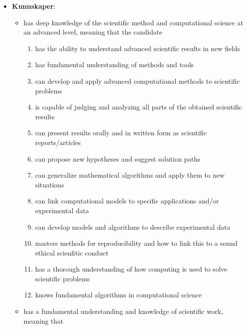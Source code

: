 \documentclass{article}
\begin{document}
\begin{itemize}
\item \textbf{Kunnskaper}: 
\begin{itemize}

 \item has deep knowledge of the scientific method and computational science at an advanced level, meaning that the candidate
\begin{enumerate}

 \item has the ability to understand advanced scientific results in new fields

 \item has fundamental understanding of methods and tools

 \item can develop and apply advanced computational methods to scientific problems

 \item is capable of judging and analyzing all parts of the obtained scientific results

 \item can present results orally and in written form as scientific reports/articles

 \item can propose new hypotheses and suggest solution paths

 \item can generalize mathematical algorithms and apply them to new situations

 \item can link computational models to specific applications and/or experimental data

 \item can develop models and algorithms to describe experimental data

\item masters methods for reproducibility and how to link this to a sound ethical scienfitic conduct

\item has a thorough understanding of how computing is used to  solve  scientific problems
\item knows fundamental algorithms in computational science

\end{enumerate}

\noindent
 \item has a fundamental understanding and knowledge of scientific work, meaning that
\begin{enumerate}


\end{enumerate}
\end{itemize}
\end{itemize}
\end{document}
